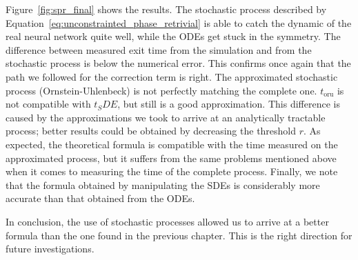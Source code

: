 Figure~\ref{fig:spr_final} shows the results. The stochastic process described by Equation~\eqref{eq:unconstrainted_phase_retrivial}
is able to catch the dynamic of the real neural network quite well, while the ODEs get stuck in the symmetry.
The difference between measured exit time from the simulation and from the stochastic process is below the numerical error.
This confirms once again that the path we followed for the correction term is right.
The approximated stochastic process (Ornstein-Uhlenbeck) is not perfectly matching the complete one.
\(t_\text{oru}\) is not compatible with \(t_SDE\), but still is a good approximation.
This difference is caused by the approximations we took to arrive at an analytically tractable process;
better results could be obtained by decreasing the threshold \(r\). 
As expected, the theoretical formula is compatible with the time measured on the approximated process,
but it suffers from the same problems mentioned above when it comes to measuring the time of the complete process.
Finally, we note that the formula obtained by manipulating the SDEs is considerably more accurate than that obtained from the ODEs. 

In conclusion, the use of stochastic processes allowed us to arrive at a better formula than the one found in the previous chapter. This is the right direction for future investigations.
